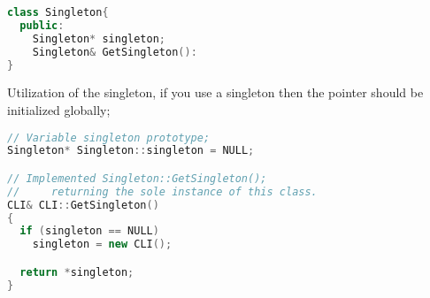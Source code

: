 \documentclass[11pt]{article}
\begin{document}
\begin{lstlisting}[language=c++,label=lst:100lst,caption=Singleton]
class Singleton{
  public:
    Singleton* singleton;
    Singleton& GetSingleton():
}
\end{lstlisting}

Utilization of the singleton, if you use a singleton then the pointer should be initialized globally;
\begin{lstlisting}[language=c++,label=lst:101lst,caption=Singleton]
// Variable singleton prototype;
Singleton* Singleton::singleton = NULL;

// Implemented Singleton::GetSingleton();
//     returning the sole instance of this class.
CLI& CLI::GetSingleton()
{
  if (singleton == NULL)
    singleton = new CLI();

  return *singleton;
}
\end{lstlisting}






\end{document}
